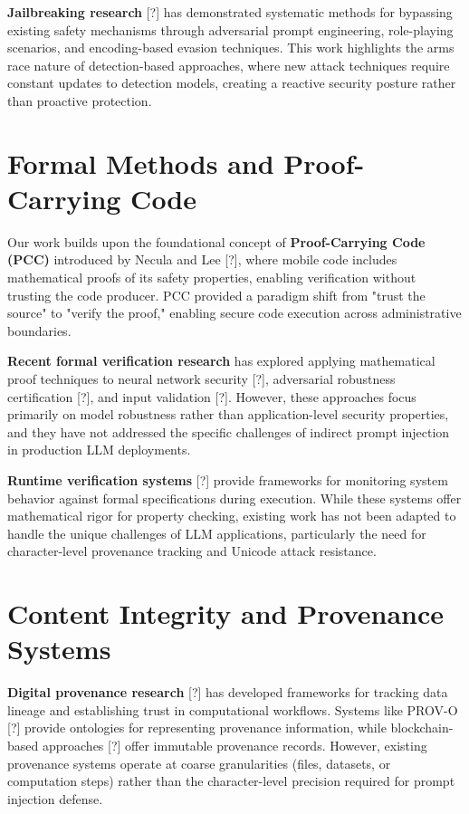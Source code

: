 \textbf{Jailbreaking research} [?] has demonstrated systematic methods for bypassing existing safety mechanisms through adversarial prompt engineering, role-playing scenarios, and encoding-based evasion techniques. This work highlights the arms race nature of detection-based approaches, where new attack techniques require constant updates to detection models, creating a reactive security posture rather than proactive protection.

\section{Formal Methods and Proof-Carrying Code}

Our work builds upon the foundational concept of \textbf{Proof-Carrying Code (PCC)} introduced by Necula and Lee [?], where mobile code includes mathematical proofs of its safety properties, enabling verification without trusting the code producer. PCC provided a paradigm shift from "trust the source" to "verify the proof," enabling secure code execution across administrative boundaries.

\textbf{Recent formal verification research} has explored applying mathematical proof techniques to neural network security [?], adversarial robustness certification [?], and input validation [?]. However, these approaches focus primarily on model robustness rather than application-level security properties, and they have not addressed the specific challenges of indirect prompt injection in production LLM deployments.

\textbf{Runtime verification systems} [?] provide frameworks for monitoring system behavior against formal specifications during execution. While these systems offer mathematical rigor for property checking, existing work has not been adapted to handle the unique challenges of LLM applications, particularly the need for character-level provenance tracking and Unicode attack resistance.

\section{Content Integrity and Provenance Systems}

\textbf{Digital provenance research} [?] has developed frameworks for tracking data lineage and establishing trust in computational workflows. Systems like PROV-O [?] provide ontologies for representing provenance information, while blockchain-based approaches [?] offer immutable provenance records. However, existing provenance systems operate at coarse granularities (files, datasets, or computation steps) rather than the character-level precision required for prompt injection defense.

